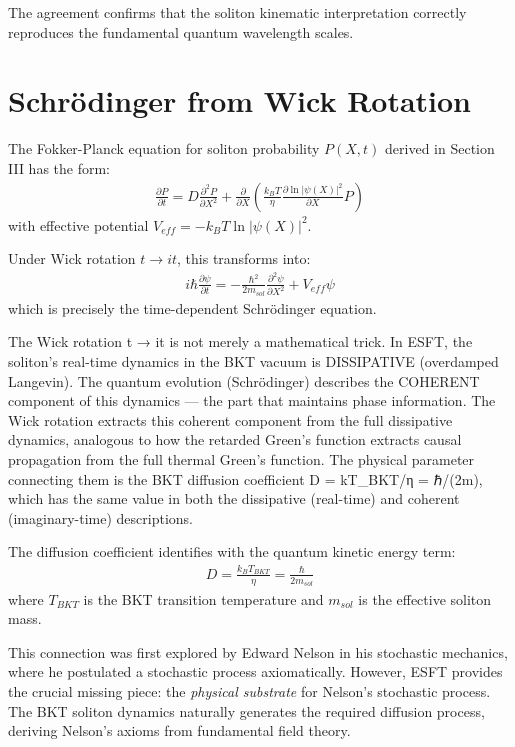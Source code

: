﻿\documentclass[twocolumn,showpacs,preprintnumbers,amsmath,amssymb,prd]{revtex4-2}
\begin{document}
The agreement confirms that the soliton kinematic interpretation correctly reproduces the fundamental quantum wavelength scales.

\section{Schrödinger from Wick Rotation}

The Fokker-Planck equation for soliton probability $P(X,t)$ derived in Section III has the form:
\begin{align}
\frac{\partial P}{\partial t} = D\frac{\partial^2 P}{\partial X^2} + \frac{\partial}{\partial X}\left(\frac{k_B T}{\eta}\frac{\partial \ln|\psi(X)|^2}{\partial X} P\right)
\end{align}
with effective potential $V_{eff} = -k_B T \ln|\psi(X)|^2$.

Under Wick rotation $t \to it$, this transforms into:
\begin{align}
i\hbar\frac{\partial \psi}{\partial t} = -\frac{\hbar^2}{2m_{sol}}\frac{\partial^2 \psi}{\partial X^2} + V_{eff}\psi
\end{align}
which is precisely the time-dependent Schrödinger equation.

The Wick rotation t → it is not merely a mathematical trick. In ESFT, the soliton's real-time dynamics in the BKT vacuum is DISSIPATIVE (overdamped Langevin). The quantum evolution (Schrödinger) describes the COHERENT component of this dynamics — the part that maintains phase information. The Wick rotation extracts this coherent component from the full dissipative dynamics, analogous to how the retarded Green's function extracts causal propagation from the full thermal Green's function. The physical parameter connecting them is the BKT diffusion coefficient D = kT_BKT/η = ℏ/(2m), which has the same value in both the dissipative (real-time) and coherent (imaginary-time) descriptions.

The diffusion coefficient identifies with the quantum kinetic energy term:
\begin{align}
D = \frac{k_B T_{BKT}}{\eta} = \frac{\hbar}{2m_{sol}}
\end{align}
where $T_{BKT}$ is the BKT transition temperature and $m_{sol}$ is the effective soliton mass.

This connection was first explored by Edward Nelson in his stochastic mechanics, where he postulated a stochastic process axiomatically. However, ESFT provides the crucial missing piece: the \emph{physical substrate} for Nelson's stochastic process. The BKT soliton dynamics naturally generates the required diffusion process, deriving Nelson's axioms from fundamental field theory.
\end{document}
